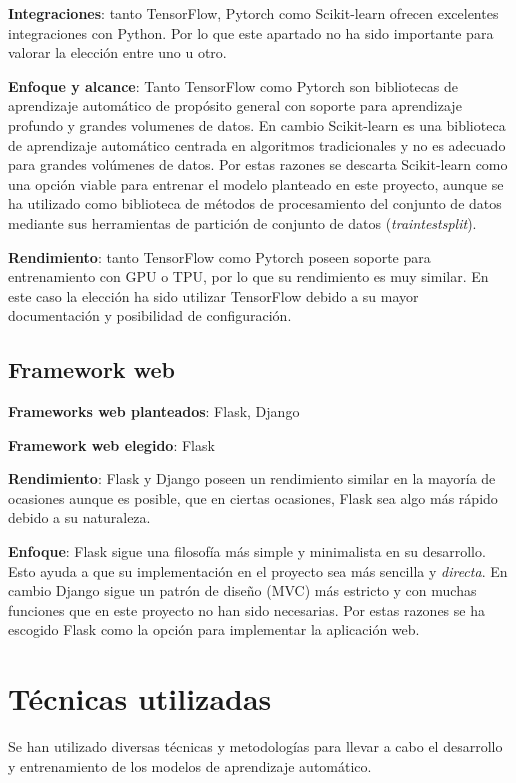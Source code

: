 \textbf{Integraciones}: tanto TensorFlow, Pytorch como Scikit-learn ofrecen excelentes integraciones con Python. Por lo que este apartado no ha sido importante para valorar la elección entre uno u otro.

\textbf{Enfoque y alcance}: Tanto TensorFlow como Pytorch son bibliotecas de aprendizaje automático de propósito general con soporte para aprendizaje profundo y grandes volumenes de datos. En cambio Scikit-learn es una biblioteca de aprendizaje automático centrada en algoritmos tradicionales y no es adecuado para grandes volúmenes de datos.
Por estas razones se descarta Scikit-learn como una opción viable para entrenar el modelo planteado en este proyecto, aunque se ha utilizado como biblioteca de métodos de procesamiento del conjunto de datos mediante sus herramientas de partición de conjunto de datos (\textit{train\textunderscore test\textunderscore split}).

\textbf{Rendimiento}: tanto TensorFlow como Pytorch poseen soporte para entrenamiento con GPU o TPU, por lo que su rendimiento es muy similar. En este caso la elección ha sido utilizar TensorFlow debido a su mayor documentación y posibilidad de configuración.

\subsection{Framework web}
\textbf{Frameworks web planteados}: Flask, Django

\textbf{Framework web elegido}: Flask

\textbf{Rendimiento}: Flask y Django poseen un rendimiento similar en la mayoría de ocasiones aunque es posible, que en ciertas ocasiones, Flask sea algo más rápido debido a su naturaleza.

\textbf{Enfoque}: Flask sigue una filosofía más simple y minimalista en su desarrollo. Esto ayuda a que su implementación en el proyecto sea más sencilla y \textit{directa}. En cambio Django sigue un patrón de diseño (MVC) más estricto y con muchas funciones que en este proyecto no han sido necesarias.
Por estas razones se ha escogido Flask como la opción para implementar la aplicación web.

\section{Técnicas utilizadas}

Se han utilizado diversas técnicas y metodologías para llevar a cabo el desarrollo y entrenamiento de los modelos de aprendizaje automático.

